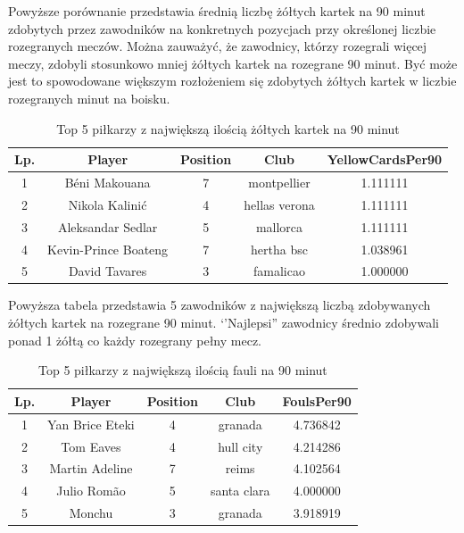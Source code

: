 \documentclass{article}
\begin{document}
Powyższe porównanie przedstawia średnią liczbę żółtych kartek na 90 minut zdobytych przez zawodników na konkretnych pozycjach przy określonej liczbie rozegranych meczów. Można zauważyć, że zawodnicy, którzy rozegrali więcej meczy, zdobyli stosunkowo mniej żółtych kartek na rozegrane 90 minut. Być może jest to spowodowane większym rozłożeniem się zdobytych żółtych kartek w liczbie rozegranych minut na boisku.


\begin{table}[H]
    \centering
    \begin{tabular}{|c|c|c|c|c|}
    \hline
    Lp. & Player & Position & Club & YellowCardsPer90 \\
    \hline
    1 & Béni Makouana & 7 & montpellier & 1.111111 \\ \hline
    2 & Nikola Kalinić & 4 & hellas verona & 1.111111 \\ \hline
    3 & Aleksandar Sedlar & 5 & mallorca & 1.111111 \\ \hline
    4 & Kevin-Prince Boateng & 7 & hertha bsc & 1.038961 \\ \hline
    5 & David Tavares & 3 & famalicao & 1.000000 \\
    \hline
    \end{tabular}
    \caption{Top 5 piłkarzy z największą ilością żółtych kartek na 90 minut}
\end{table}

Powyższa tabela przedstawia 5 zawodników z największą liczbą zdobywanych żółtych kartek na rozegrane 90 minut. ‘’Najlepsi” zawodnicy średnio  zdobywali ponad 1 żółtą co każdy rozegrany pełny mecz.

\begin{table}[H]
    \centering
    \begin{tabular}{|c|c|c|c|c|}
    \hline
    Lp. & Player & Position & Club & FoulsPer90 \\
    \hline
    1 & Yan Brice Eteki & 4 & granada & 4.736842 \\ \hline
    2 & Tom Eaves & 4 & hull city & 4.214286 \\ \hline
    3 & Martin Adeline & 7 & reims & 4.102564 \\ \hline
    4 & Julio Romão & 5 & santa clara & 4.000000 \\ \hline
    5 & Monchu & 3 & granada & 3.918919 \\
    \hline
    \end{tabular}
    \caption{Top 5 piłkarzy z największą ilością fauli na 90 minut}
\end{table}
\end{document}
